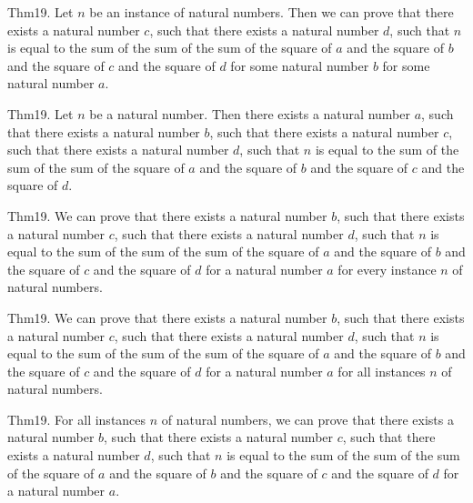 \documentclass{article}
\begin{document}
Thm19. Let $n$ be an instance of natural numbers. Then we can prove that there exists a natural number $c$, such that there exists a natural number $d$, such that $n$ is equal to the sum of the sum of the sum of the square of $a$ and the square of $b$ and the square of $c$ and the square of $d$ for some natural number $b$ for some natural number $a$.

Thm19. Let $n$ be a natural number. Then there exists a natural number $a$, such that there exists a natural number $b$, such that there exists a natural number $c$, such that there exists a natural number $d$, such that $n$ is equal to the sum of the sum of the sum of the square of $a$ and the square of $b$ and the square of $c$ and the square of $d$.

Thm19. We can prove that there exists a natural number $b$, such that there exists a natural number $c$, such that there exists a natural number $d$, such that $n$ is equal to the sum of the sum of the sum of the square of $a$ and the square of $b$ and the square of $c$ and the square of $d$ for a natural number $a$ for every instance $n$ of natural numbers.

Thm19. We can prove that there exists a natural number $b$, such that there exists a natural number $c$, such that there exists a natural number $d$, such that $n$ is equal to the sum of the sum of the sum of the square of $a$ and the square of $b$ and the square of $c$ and the square of $d$ for a natural number $a$ for all instances $n$ of natural numbers.

Thm19. For all instances $n$ of natural numbers, we can prove that there exists a natural number $b$, such that there exists a natural number $c$, such that there exists a natural number $d$, such that $n$ is equal to the sum of the sum of the sum of the square of $a$ and the square of $b$ and the square of $c$ and the square of $d$ for a natural number $a$.
\end{document}
